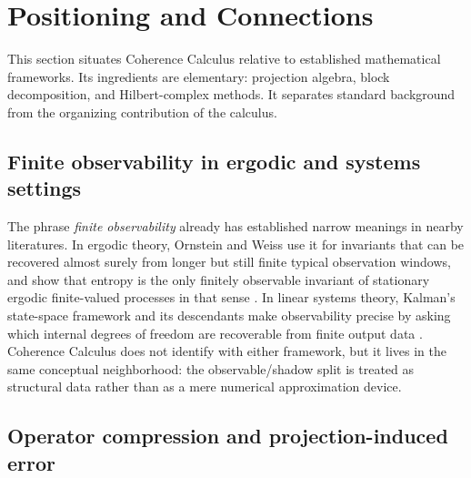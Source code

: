 \section{Positioning and Connections}
\label{sec:positioning}

This section situates Coherence Calculus relative to established mathematical
frameworks. Its ingredients are elementary: projection algebra, block
decomposition, and Hilbert-complex methods. It separates
standard background from the organizing contribution of the calculus.

\subsection{Finite observability in ergodic and systems settings}
\label{subsec:finite-observability-context}

The phrase \emph{finite observability} already has established narrow meanings
in nearby literatures. In ergodic theory, Ornstein and Weiss use it for
invariants that can be recovered almost surely from longer but still finite
typical observation windows, and show that entropy is the only finitely
observable invariant of stationary ergodic finite-valued processes in that
sense \cite{OrnsteinWeiss2007}. In linear systems theory, Kalman's
state-space framework and its descendants make observability precise by asking
which internal degrees of freedom are recoverable from finite output data
\cite{Kalman1963,Antoulas2005}. Coherence Calculus does not identify with
either framework, but it lives in the same conceptual neighborhood: the
observable/shadow split is treated as structural data rather than as a mere
numerical approximation device.

\subsection{Operator compression and projection-induced error}
\label{subsec:operator-compression}

